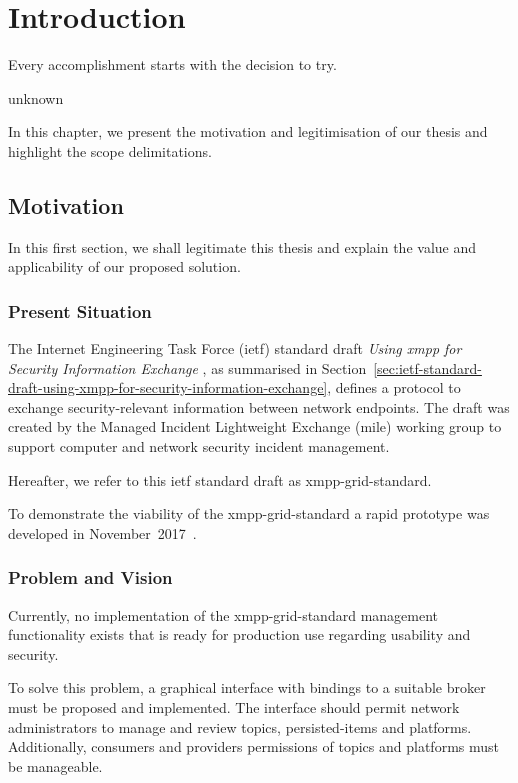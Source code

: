 \newcommand{\code}{\texttt}
\chapter{Introduction}
\label{sec:introduction}

\epigraph{Every accomplishment starts with the decision to try.}{unknown}
In this chapter, we present the motivation and legitimisation of our thesis and highlight the scope delimitations.

\section{Motivation}
In this first section, we shall legitimate this thesis and explain the value and applicability of our proposed solution.

\subsection{Present Situation}
The Internet Engineering Task Force (\gls{ietf}) standard draft \emph{Using \gls{xmpp} for Security Information Exchange} \cite{ietf-mile-xmpp-grid-05}, as summarised in Section~\ref{sec:ietf-standard-draft-using-xmpp-for-security-information-exchange}, defines a protocol to exchange security-relevant information between network endpoints.
The draft was created by the Managed Incident Lightweight Exchange (\gls{mile}) working group to support computer and network security incident management.

Hereafter, we refer to this \gls{ietf} standard draft as \gls{xmpp-grid-standard}.

To demonstrate the viability of the \gls{xmpp-grid-standard} a rapid prototype was developed in November~2017~\cite{xmpp-grid-prototype}.

\subsection{Problem and Vision}
Currently, no implementation of the \gls{xmpp-grid-standard} management functionality exists that is ready for production use regarding usability and security.

To solve this problem, a graphical interface with bindings to a suitable \gls{broker} must be proposed and implemented.
The interface should permit network administrators to manage and review \glspl{topic}, \glspl{persisted-item} and \glspl{platform}.
Additionally, \glspl{consumer} and \glspl{provider} permissions of \glspl{topic} and \glspl{platform} must be manageable.

